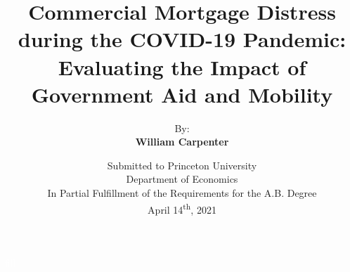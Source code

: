 \documentclass[11pt]{article} %
\begin{document}
\thispagestyle{empty}
\title{\vspace{-0.0em}Commercial Mortgage Distress during the COVID-19 Pandemic: \\ Evaluating the Impact of Government Aid and Mobility}
\author{\vspace{2em} By: \\ \vspace{-0.5em} \textbf{William Carpenter}}
\date{\vspace{25em} \normalsize{Submitted to Princeton University} \\ Department of Economics \\ In Partial Fulfillment of the Requirements for the A.B. Degree \\ \vspace {3.0em} April 14\textsuperscript{th}, 2021}
\maketitle
\thispagestyle{empty}
\newpage
\textcolor{white}{fill}\vspace{5em}
\end{document}
